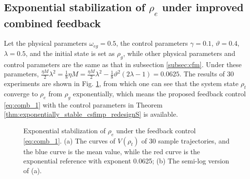 \documentclass[]{elsarticle}
\begin{document}
\subsection{Exponential stabilization of $\rho_e$ under improved combined feedback}\label{subsec:icf}
Let the physical parameters $\omega_{eg}=0.5$, the control parameters $\gamma=0.1$, $\vartheta=0.4$, $\lambda=0.5$, and the initial state is set as $\rho_g$, while other physical parameters and control parameters are the same as that in subsection \ref{subsec:cfm}. Under these parameters,  $\frac{{\eta M}}{2}\lambda^{2}=\frac{1}{8}\eta M=\frac{{\eta M}}{2}\lambda^{2}-\frac{1}{8}\vartheta^2\left(2\lambda-1\right)=0.0625$. The results of 30 experiments are shown in Fig. \ref{figur:V_100samples}, from which one can see that the system state $\rho_{t}$ converge to $\rho_{e}$ from $\rho_g$ exponentially, which means the proposed feedback control \eqref{eq:comb_1} with the control parameters in Theorem \ref{thm:exponentially_stable_csfimp_redesignS} is available. 
\begin{figure}[!htbp]
	\centering
	\hfil
	\caption{Exponential stabilization of $\rho_{e}$ under the feedback control \eqref{eq:comb_1}. (a) The curves of $V\left(\rho_{t}\right)$ of 30  sample trajectories, and the blue curve is the mean value, while the red curve is the exponential reference with exponent 0.0625; (b)  The semi-log version of (a).}
	\label{figur:V_100samples}
\end{figure}
\end{document}
